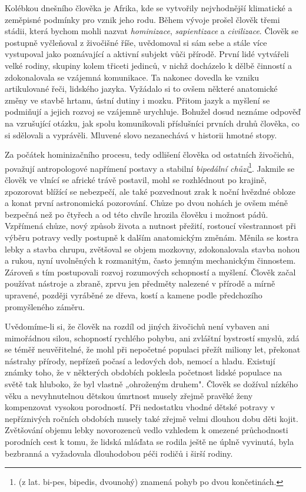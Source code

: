         Kolébkou dnešního člověka je Afrika, kde se vytvořily nejvhodnější klimatické a zeměpisné
        podmínky pro vznik jeho rodu. Během vývoje prošel člověk třemi stádii, která bychom mohli
        nazvat \emph{hominizace}, \emph{sapientizace} a \emph{civilizace}. Člověk se postupně
        vyčleňoval z živočišné říše, uvědomoval si sám sebe a stále více vystupoval jako poznávající
        a aktivní subjekt vůči přírodě. První lidé vytvářeli velké rodiny, skupiny kolem třiceti
        jedinců, v nichž docházelo k dělbě činností a zdokonalovala se vzájemná komunikace. Ta
        nakonec dovedla ke vzniku artikulované řeči, lidského jazyka. Vyžádalo si to ovšem některé
        anatomické změny ve stavbě hrtanu, ústní dutiny i mozku. Přitom jazyk a myšlení se podmiňují
        a jejich rozvoj se vzájemně urychluje. Bohužel dosud neznáme odpověď na vzrušující otázku,
        jak spolu komunikovali příslušníci prvních druhů člověka, co si sdělovali a vyprávěli.
        Mluvené slovo nezanechává v historii hmotné stopy.

        Za počátek hominizačního procesu, tedy odlišení člověka od ostatních živočichů, považují
        antropologové napřímení postavy a stabilní \emph{bipedální chůzi}\footnote{(z lat. bi-pes,
        bipedis, dvounohý) znamená pohyb po dvou končetinách.}. Jakmile se člověk ve vlnící se
        africké trávě postavil, mohl se rozhlédnout po krajině, zpozorovat blížící se nebezpečí, ale
        také pozvednout zrak k noční hvězdné obloze a konat první astronomická pozorování. Chůze po
        dvou nohách je ovšem méně bezpečná než po čtyřech a od této chvíle hrozila člověku i možnost
        pádů. Vzpřímená chůze, nový způsob života a nutnost přežití, rostoucí všestrannost při
        výběru potravy vedly postupně k dalším anatomickým změnám. Měnila se kostra lebky a stavba
        chrupu, zvětšoval se objem mozkovny, zdokonalovala stavba nohou a rukou, nyní uvolněných k
        rozmanitým, často jemným mechanickým činnostem. Zároveň s tím postupovali rozvoj rozumových
        schopností a myšlení. Člověk začal používat nástroje a zbraně, zprvu jen předměty nalezené v
        přírodě a mírně upravené, později vyráběné ze dřeva, kostí a kamene podle předchozího
        promyšleného záměru.

        Uvědomíme-li si, že člověk na rozdíl od jiných živočichů není vybaven ani mimořádnou silou,
        schopností rychlého pohybu, ani zvláštní bystrostí smyslů, zdá se téměř neuvěřitelné, že
        mohl při nepočetné populaci přežít miliony let, překonat nástrahy přírody, nepřízeň počasí a
        ledových dob, nemocí a hladu. Existují známky toho, že v některých obdobích poklesla
        početnost lidské populace na světě tak hluboko, že byl vlastně „ohroženým druhem". Člověk se
        dožíval nízkého věku a nevyhnutelnou dětskou úmrtnost musely zřejmě pravěké ženy kompenzovat
        vysokou porodností. Při nedostatku vhodné dětské potravy v nepříznivých ročních obdobích
        musely také zřejmě velmi dlouhou dobu děti kojit. Zvětšování objemu lebky novorozenců vedlo
        vzhledem k omezené průchodnosti porodních cest k tomu, že lidská mláďata se rodila ještě ne
        úplně vyvinutá, byla bezbranná a vyžadovala dlouhodobou péči rodičů i širší rodiny.


